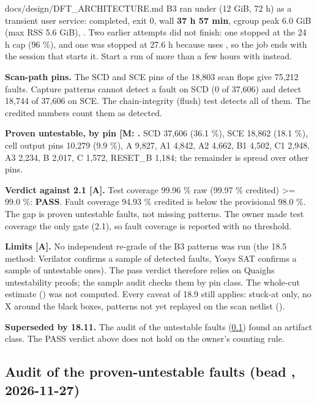 \begin{relocated}{docs/design/DFT_ARCHITECTURE.md}
B3 ran under  (12 GiB, 72 h) as a transient user
service: completed, exit 0, wall \textbf{37 h 57 min}, cgroup peak
6.0 GiB (max RSS 5.6 GiB), . Two earlier attempts did
not finish: one stopped at the 24 h cap (96 \%), and one was stopped at
27.6 h because  uses , so
the job ends with the session that starts it. Start a run of more than
a few hours with  instead.

\textbf{Scan-path pins.} The SCD and SCE pins of the 18,803 scan flops
give 75,212 faults. Capture patterns cannot detect a fault on SCD (0 of
37,606) and detect 18,744 of 37,606 on SCE. The chain-integrity (flush)
test detects all of them. The credited numbers count them as detected.

\textbf{Proven untestable, by pin {[}M: 
\code{by_pin}{]}.} SCD 37,606 (36.1 \%), SCE 18,862 (18.1 \%), cell
output pins 10,279 (9.9 \%), A 9,827, A1 4,842, A2 4,662, B1 4,502, C1
2,948, A3 2,234, B 2,017, C 1,572, RESET\_B 1,184; the remainder is
spread over other pins.

\textbf{Verdict against 2.1 {[}A{]}.} Test coverage 99.96 \% raw
(99.97 \% credited) \textgreater= 99.0 \%: \textbf{PASS}. Fault coverage
94.93 \% credited is below the provisional 98.0 \%. The gap is proven
untestable faults, not missing patterns. The owner made test coverage
the only gate (2.1), so fault coverage is reported with no threshold.

\textbf{Limits {[}A{]}.} No independent re-grade of the B3 patterns
was run (the 18.5 method: Verilator confirms a sample of detected
faults, Yosys SAT confirms a sample of untestable ones). The pass verdict
therefore relies on Quaigh\textquotesingle s untestability proofs; the
sample audit  checks them by pin class. The whole-cut
estimate () was not computed. Every
caveat of 18.9 still applies: stuck-at only, no X around the black
boxes, patterns not yet replayed on the scan netlist ().

\textbf{Superseded by 18.11.} The audit of the untestable faults
(\cref{tm:ch:dft-architecture:1811-untestable-audit}) found an artifact
class. The PASS verdict above does not hold on the owner's counting rule.

\subsection{Audit of the proven-untestable faults (bead ,
2026-11-27)}\label{tm:ch:dft-architecture:1811-untestable-audit}


\end{relocated}
